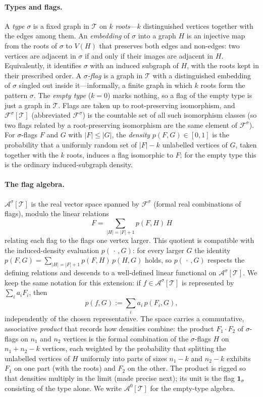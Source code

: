 \documentclass[11pt]{article}
\theoremstyle{definition}
\newcommand{\A}{\mathcal{A}}
\newcommand{\F}{\mathcal{F}}
\newcommand{\T}{\mathcal{T}}
\newcommand{\one}{\mathbf 1}
\begin{document}
\paragraph{Types and flags.}
A \emph{type} $\sigma$ is a fixed graph in $\T$ on $k$ \emph{roots}---$k$
distinguished vertices together with the edges among them.  An \emph{embedding}
of $\sigma$ into a graph $H$ is an injective map from the roots of $\sigma$ to
$V(H)$ that preserves both edges
and non-edges: two vertices are adjacent in $\sigma$ if and only if their images
are adjacent in $H$.  Equivalently, it identifies $\sigma$ with an induced
subgraph of $H$, with the roots kept in their prescribed order.
A \emph{$\sigma$-flag} is a graph in $\T$ with a distinguished embedding of
$\sigma$ singled out inside it---informally, a finite graph in which $k$ roots
form the pattern $\sigma$.  The \emph{empty type}
($k=0$) marks nothing, so a flag of the empty type is just a graph in $\T$.
Flags are taken up to root-preserving isomorphism, and $\F^\sigma[\T]$
(abbreviated $\F^\sigma$) is the countable set of all such isomorphism classes
(so two flags related by a root-preserving isomorphism are the same element of
$\F^\sigma$).  For $\sigma$-flags $F$ and $G$ with $|F|\le|G|$, the
\emph{density} $p(F,G)\in[0,1]$ is the probability that a uniformly random set of
$|F|-k$ unlabelled vertices of $G$, taken together with the $k$ roots, induces a flag
isomorphic to $F$; for the empty type this is the ordinary induced-subgraph density.

\paragraph{The flag algebra.}
$\A^\sigma[\T]$ is the real vector space spanned by $\F^\sigma$ (formal real combinations
of flags), modulo the linear relations
\[
  F=\sum_{|H|=|F|+1}p(F,H)\,H
\]
relating each flag to the flags one vertex larger.  This quotient is compatible with the
induced-density evaluation $p(\,\cdot\,,G)$: for every larger $G$ the identity
$p(F,G)=\sum_{|H|=|F|+1}p(F,H)\,p(H,G)$ holds, so $p(\,\cdot\,,G)$ respects the defining
relations and descends to a well-defined linear functional on $\A^\sigma[\T]$.  We keep the
same notation for this extension: if $f\in\A^\sigma[\T]$ is represented by
$\sum_i a_iF_i$, then
\[
  p(f,G):=\sum_i a_i\,p(F_i,G),
\]
independently of the chosen representative.  The space
carries a commutative, associative \emph{product} that records how densities combine: the
product $F_1\cdot F_2$ of $\sigma$-flags on $n_1$ and $n_2$ vertices is the formal
combination of the $\sigma$-flags $H$ on $n_1+n_2-k$ vertices, each weighted by the
probability that splitting the unlabelled vertices of $H$ uniformly into parts of sizes
$n_1-k$ and $n_2-k$ exhibits $F_1$ on one part (with the roots) and $F_2$ on the other.
The product is rigged so that densities multiply in the limit (made precise next); its
unit is the flag $\one_\sigma$ consisting of the type alone.  We write $\A^0[\T]$ for the
empty-type algebra.
\end{document}
